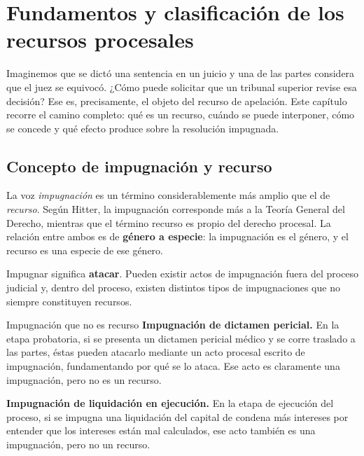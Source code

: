 \documentclass[12pt,oneside]{book}
\begin{document}
\tableofcontents


\chapter{Fundamentos y clasificación de los recursos procesales}

\begin{note}
Imaginemos que se dictó una sentencia en un juicio y una de las partes considera que el juez se equivocó. ¿Cómo puede solicitar que un tribunal superior revise esa decisión? Ese es, precisamente, el objeto del recurso de apelación. Este capítulo recorre el camino completo: qué es un recurso, cuándo se puede interponer, cómo se concede y qué efecto produce sobre la resolución impugnada.
\end{note}

\section{Concepto de impugnación y recurso}

La voz \textit{impugnación} es un término considerablemente más amplio que el de \textit{recurso}. Según Hitter, la impugnación corresponde más a la Teoría General del Derecho, mientras que el término recurso es propio del derecho procesal. La relación entre ambos es de \textbf{género a especie}: la impugnación es el género, y el recurso es una especie de ese género.

Impugnar significa \textbf{atacar}. Pueden existir actos de impugnación fuera del proceso judicial y, dentro del proceso, existen distintos tipos de impugnaciones que no siempre constituyen recursos.

\begin{example}{Impugnación que no es recurso}
\textbf{Impugnación de dictamen pericial.} En la etapa probatoria, si se presenta un dictamen pericial médico y se corre traslado a las partes, éstas pueden atacarlo mediante un acto procesal escrito de impugnación, fundamentando por qué se lo ataca. Ese acto es claramente una impugnación, pero no es un recurso.

\textbf{Impugnación de liquidación en ejecución.} En la etapa de ejecución del proceso, si se impugna una liquidación del capital de condena más intereses por entender que los intereses están mal calculados, ese acto también es una impugnación, pero no un recurso.
\end{example}
\end{document}
